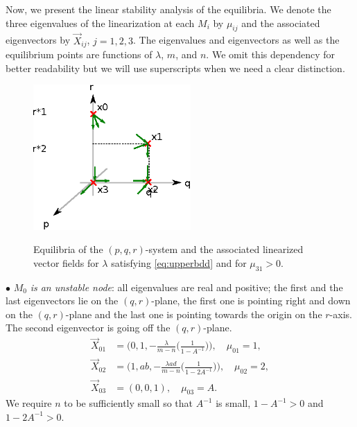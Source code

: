 \documentclass[a4paper,11pt]{article}
\numberwithin{step}{dummy}
\begin{document}
Now, we present the linear stability analysis of the equilibria. We denote the three eigenvalues of the linearization at each $M_i$ by $\mu_{ij}$ and the associated eigenvectors by $\vec{X}_{ij}$, $j=1,2,3$. The eigenvalues and eigenvectors as well as the equilibrium points are functions of $ \lambda$, $m$, and $n$. We omit this dependency for better readability but we will use superscripts when we need a clear distinction.
\begin{figure}
  \centering
  \includegraphics[width=6cm]{equilibria0.eps} \label{fig:equilibria0}
  \caption{Equilibria of the $(p,q,r)$-system and the associated linearized vector fields for $\lambda$ satisfying \eqref{eq:upperbdd} and for $\mu_{31}>0$. }
\end{figure}


$\bullet$ $M_0$ \emph{is an unstable node}: all eigenvalues are real and positive; the first and the last eigenvectors lie on the $(q,r)$-plane, 
the first one is pointing right and down on the $(q,r)$-plane and the last one is pointing towards the origin on the $r$-axis. 
The second eigenvector is going off the $(q,r)$-plane. 
\begin{align*}
  \vec{X}_{01} &= \Bigg(0 , 1 , - \frac{\lambda}{m-n} \bigg(\frac{1}{1- A^{-1}} \bigg)\Bigg), \quad \mu_{01}=1,\\
  \vec{X}_{02} &= \Bigg( 1 , ab , - \frac{\lambda ad}{m-n} \bigg(\frac{1}{1- 2A^{-1}} \bigg)\Bigg), \quad \mu_{02}=2,\\
  \vec{X}_{03} &= (0 , 0 , 1), \quad \mu_{03}= A.%
\end{align*}
We require $n$ to be sufficiently small so that $A^{-1}$ is small, $1-A^{-1}>0$ and $1-2A^{-1}>0$.
\end{document}
